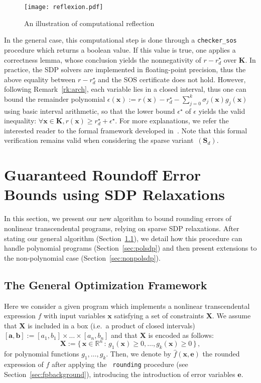 \documentclass[preprint]{sigplanconf}
\newcommand{\code}[1]{\lstinline{#1}}
\newcommand{\R}{\mathbb{R}}
\newcommand{\x}{\mathbf{x}}
\newcommand{\e}{\mathbf{e}}
\renewcommand{\b}{\mathbf{b}}
\def\a{\mathbf{a}}
\def\S{\mathbf{S}}
\def\K{\mathbf{K}}
\def\S{\mathbf{S}}
\def\X{\mathbf{X}}
\theoremstyle{plain}
\begin{document}
\fi
%
\begin{figure}[!ht]
\centering
\texttt{[image: reflexion.pdf]}
\caption{An illustration of computational reflection}	
\label{fig:reflexion}
\end{figure}
%
In the general case, this computational step is done through a \code{checker_sos} procedure which returns a boolean value. If this value is true, one applies a correctness lemma, whose conclusion yields the nonnegativity of $r - r_d^\star$ over $\K$.
In practice, the SDP solvers are implemented in floating-point precision, thus the above equality between $r - r_d^\star$ and the SOS certificate does not hold. However, following Remark~\ref{rk:arch}, each variable lies in a closed interval, thus one can bound the remainder polynomial $\epsilon(\x) := r(\x) - r_d^\star - \sum_{j=0}^k \sigma_j(\x) g_j(\x)$ using basic interval arithmetic, so that the lower bound $\epsilon^\star$ of $\epsilon$ yields the valid inequality: $\forall \x \in \K, r(\x) \geq r_d^\star + \epsilon^\star$.
For more explanations, we refer the interested reader to the formal framework developed in~\cite{jfr14}. Note that this formal verification remains valid when considering the sparse variant~$(\S_d)$.
%
\section{Guaranteed Roundoff Error Bounds using SDP Relaxations}
\label{sec:fpsdp}
In this section, we present our new algorithm to bound rounding errors of nonlinear transcendental programs, relying on sparse SDP relaxations. After stating our general algorithm (Section~\ref{sec:transcsdp}), we detail how this procedure can handle polynomial programs (Section~\ref{sec:polsdp}) and then present extensions to the non-polynomial case (Section~\ref{sec:nonpolsdp}).

\subsection{The General Optimization Framework}
\label{sec:transcsdp}
%
Here we consider a given program which implements a nonlinear transcendental expression $f$ with input variables $\x$ satisfying a set of constraints $\X$. We assume that  $\X$ is included in a box (i.e.~a product of closed intervals) $[\a, \b] := [a_1, b_1] \times \dots \times [a_n, b_n]$ and that $\X$ is encoded as follows: 
\[ 
\X := \{\, \x \in \R^n \, : \, g_1 (\x) \geq 0, \dots, g_{k} (\x) \geq 0 \,\} \,,
\]
for polynomial functions $g_1, \dots, g_k$. 
%
Then, we denote by $\hat{f}(\x,\e)$ the rounded expression of $f$ after applying the ~\lstinline|rounding| procedure (see Section~\ref{sec:fpbackground}), introducing the introduction of error variables $\e$. 
\end{document}
